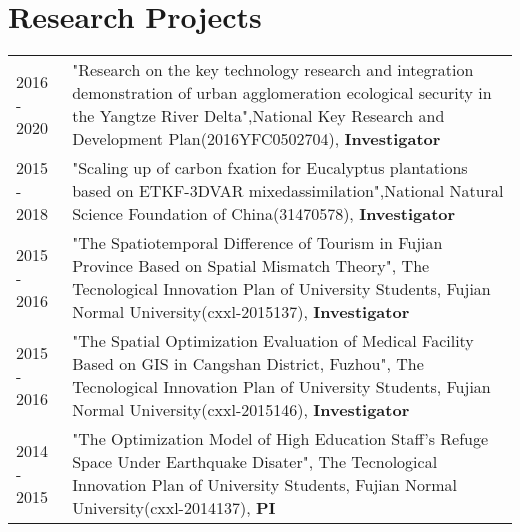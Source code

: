 \section*{Research Projects}

\begin{tabular}{p{} p{}}
2016 - 2020 & "Research on the key technology research and integration demonstration of urban agglomeration ecological security in the Yangtze River Delta",National Key Research and Development Plan(2016YFC0502704), \textbf{Investigator} \\
2015 - 2018 & "Scaling up of carbon fxation for Eucalyptus plantations based on ETKF-3DVAR mixedassimilation",National Natural Science Foundation of China(31470578), \textbf{Investigator}\\
2015 - 2016 & "The Spatiotemporal Difference of Tourism in Fujian Province Based on Spatial Mismatch Theory", The Tecnological Innovation Plan of University Students, Fujian Normal University(cxxl-2015137), \textbf{Investigator}\\
2015 - 2016 & "The Spatial Optimization Evaluation of Medical Facility Based on GIS in Cangshan District, Fuzhou", The Tecnological Innovation Plan of University Students, Fujian Normal University(cxxl-2015146), \textbf{Investigator}\\
2014 - 2015 & "The Optimization Model of High Education Staﬀ’s Refuge Space Under Earthquake Disater", The Tecnological Innovation Plan of University Students, Fujian Normal University(cxxl-2014137), \textbf{PI}\\
\end{tabular}
